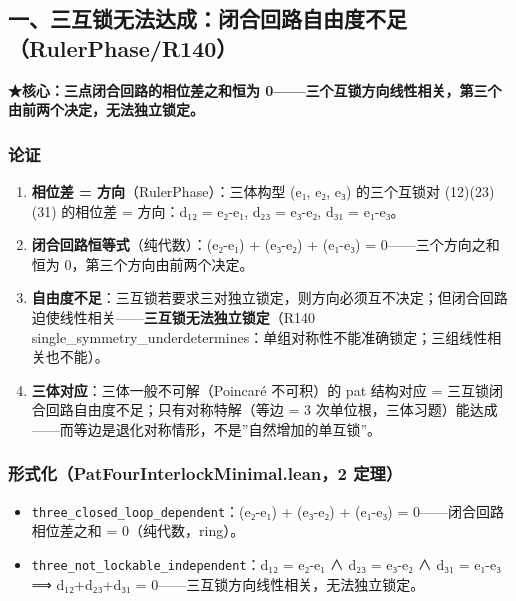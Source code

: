 \documentclass[
]{article}
\providecommand{\tightlist}{%
  \setlength{\itemsep}{0pt}\setlength{\parskip}{0pt}}
\begin{document}
\subsection{一、三互锁无法达成：闭合回路自由度不足（RulerPhase/R140）}\label{ux4e00ux4e09ux4e92ux9501ux65e0ux6cd5ux8fbeux6210ux95edux5408ux56deux8defux81eaux7531ux5ea6ux4e0dux8db3rulerphaser140}

\textbf{★核心：三点闭合回路的相位差之和恒为
0------三个互锁方向线性相关，第三个由前两个决定，无法独立锁定。}

\subsubsection{论证}\label{ux8bbaux8bc1}

\begin{enumerate}
\def\labelenumi{\arabic{enumi}.}
\tightlist
\item
  \textbf{相位差 = 方向}（RulerPhase）：三体构型 (e₁, e₂, e₃)
  的三个互锁对 (12)(23)(31) 的相位差 = 方向：d₁₂ = e₂-e₁, d₂₃ = e₃-e₂,
  d₃₁ = e₁-e₃。
\item
  \textbf{闭合回路恒等式}（纯代数）：(e₂-e₁) + (e₃-e₂) + (e₁-e₃) =
  0------三个方向之和恒为 0，第三个方向由前两个决定。
\item
  \textbf{自由度不足}：三互锁若要求三对独立锁定，则方向必须互不决定；但闭合回路迫使线性相关------\textbf{三互锁无法独立锁定}（R140
  single\_symmetry\_underdetermines：单组对称性不能准确锁定；三组线性相关也不能）。
\item
  \textbf{三体对应}：三体一般不可解（Poincaré 不可积）的 pat 结构对应 =
  三互锁闭合回路自由度不足；只有对称特解（等边 = 3
  次单位根，三体习题）能达成------而等边是退化对称情形，不是''自然增加的单互锁''。
\end{enumerate}

\subsubsection{形式化（PatFourInterlockMinimal.lean，2
定理）}\label{ux5f62ux5f0fux5316patfourinterlockminimal.lean2-ux5b9aux7406}

\begin{itemize}
\tightlist
\item
  \texttt{three\_closed\_loop\_dependent}：(e₂-e₁) + (e₃-e₂) + (e₁-e₃) =
  0------闭合回路相位差之和 = 0（纯代数，ring）。
\item
  \texttt{three\_not\_lockable\_independent}：d₁₂ = e₂-e₁ ∧ d₂₃ = e₃-e₂
  ∧ d₃₁ = e₁-e₃ ⟹ d₁₂+d₂₃+d₃₁ =
  0------三互锁方向线性相关，无法独立锁定。
\end{itemize}
\end{document}
